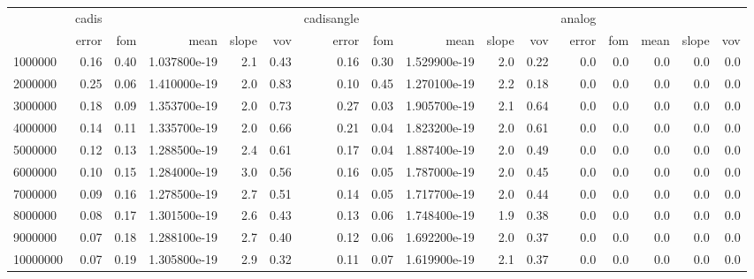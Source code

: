 \begin{tabular}{lrrrrrrrrrrrrrrr}
\toprule
{} & cadis &      &               &       &      & cadisangle &      &               &       &      & analog &     &      &       &     \\
{} & error &  fom &          mean & slope &  vov &      error &  fom &          mean & slope &  vov &  error & fom & mean & slope & vov \\
\midrule
1000000  &  0.16 & 0.40 &  1.037800e-19 &   2.1 & 0.43 &       0.16 & 0.30 &  1.529900e-19 &   2.0 & 0.22 &    0.0 & 0.0 &  0.0 &   0.0 & 0.0 \\
2000000  &  0.25 & 0.06 &  1.410000e-19 &   2.0 & 0.83 &       0.10 & 0.45 &  1.270100e-19 &   2.2 & 0.18 &    0.0 & 0.0 &  0.0 &   0.0 & 0.0 \\
3000000  &  0.18 & 0.09 &  1.353700e-19 &   2.0 & 0.73 &       0.27 & 0.03 &  1.905700e-19 &   2.1 & 0.64 &    0.0 & 0.0 &  0.0 &   0.0 & 0.0 \\
4000000  &  0.14 & 0.11 &  1.335700e-19 &   2.0 & 0.66 &       0.21 & 0.04 &  1.823200e-19 &   2.0 & 0.61 &    0.0 & 0.0 &  0.0 &   0.0 & 0.0 \\
5000000  &  0.12 & 0.13 &  1.288500e-19 &   2.4 & 0.61 &       0.17 & 0.04 &  1.887400e-19 &   2.0 & 0.49 &    0.0 & 0.0 &  0.0 &   0.0 & 0.0 \\
6000000  &  0.10 & 0.15 &  1.284000e-19 &   3.0 & 0.56 &       0.16 & 0.05 &  1.787000e-19 &   2.0 & 0.45 &    0.0 & 0.0 &  0.0 &   0.0 & 0.0 \\
7000000  &  0.09 & 0.16 &  1.278500e-19 &   2.7 & 0.51 &       0.14 & 0.05 &  1.717700e-19 &   2.0 & 0.44 &    0.0 & 0.0 &  0.0 &   0.0 & 0.0 \\
8000000  &  0.08 & 0.17 &  1.301500e-19 &   2.6 & 0.43 &       0.13 & 0.06 &  1.748400e-19 &   1.9 & 0.38 &    0.0 & 0.0 &  0.0 &   0.0 & 0.0 \\
9000000  &  0.07 & 0.18 &  1.288100e-19 &   2.7 & 0.40 &       0.12 & 0.06 &  1.692200e-19 &   2.0 & 0.37 &    0.0 & 0.0 &  0.0 &   0.0 & 0.0 \\
10000000 &  0.07 & 0.19 &  1.305800e-19 &   2.9 & 0.32 &       0.11 & 0.07 &  1.619900e-19 &   2.1 & 0.37 &    0.0 & 0.0 &  0.0 &   0.0 & 0.0 \\
\bottomrule
\end{tabular}
